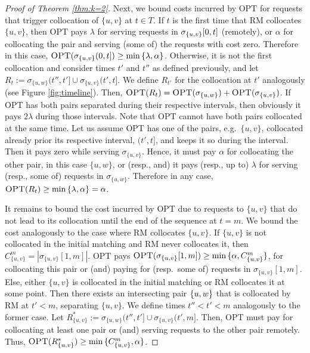 \documentclass[a4paper,anonymous,USenglish]{lipics-v2019}
\newcommand{\OPT}{\textsc{OPT}\xspace}
\newcommand{\RM}{\textsc{RM}\xspace} %
\DeclarePairedDelimiter\set{\{}{\}}
\begin{document}
\begin{proof}[Proof of Theorem \ref{thm:k=2}]
	
	Next,
	we bound  costs incurred by \OPT for requests that trigger collocation of $\{u,v\}$ at $t \in T$.
	If $t$ is the first time that \RM collocates $\{u,v\}$,
	 then  \OPT pays
	$\lambda$ for serving requests in $\sigma_{\set{u,v}}[0,t]$ (remotely),
	or $\alpha$ for collocating the pair and
	serving (some of) the requests with  cost zero.
	Therefore in this case,
	$\OPT(\sigma_{\{u,v\}}(0,t]) \geq  \min{\{ \lambda,\alpha \}}$.
	Otherwise,
	it is not the first collocation and
	consider times $t'$ and $t''$ as defined previously,
	 and let 
	$R_t := \sigma_{\{u,w\}}(t'',t'] \cup \sigma_{\{u,v\}}(t',t] $.
	We define $R_{t'}$ for the collocation at $t'$  analogously
	(see Figure \ref{fig:timeline}).
	Then,
	$\OPT(R_t) =\OPT (\sigma_{\{u,w\}}) 
	+ \OPT(\sigma_{\{u,v\}}) $.
	If \OPT has both pairs separated during their respective intervals,
	then obviously it pays $2\lambda$ during those intervals.
	Note that \OPT cannot have both pairs collocated at the same time.
	Let us assume \OPT has one of the pairs,
	e.g.~$\{u,v\}$,
	 collocated already prior its respective interval, $(t',t]$,
	 and keeps it so during the interval.
	 Then it pays zero while serving $\sigma_{\{u,v\}}$.
	Hence,
	it must pay $\alpha$ for collocating the other pair, in this case $\{u,w\}$,
	or (resp., and) it pays (resp., up to) $\lambda$ for serving (resp., some of) requests in $\sigma_{\{u,w\}}$. 
	Therefore in any case,
	$\OPT(R_t) \geq  \min{\{ \lambda,\alpha \}} = \alpha$.
	
	It remains to bound the cost  incurred by \OPT due to requests to $\{u,v\}$ that do not lead to its collocation until the end of the sequence at $t=m$.
	We bound the cost analogously to the case where \RM collocates $\{u,v\}$.
	If $\{u,v\}$ is not collocated in the initial matching
	and \RM never collocates it,
	then $ C^{m}_{ \{u,v\} } =| \sigma_{\{u,v\}}[1,m] |$.
	\OPT pays
	$\OPT(\sigma_{\{u,v\}}[1,m]) 
	\geq \min{ \{ \alpha, C^{m}_{ \{u,v\} } \} }$,
	for collocating this pair or (and) paying for (resp.~some of) requests in $\sigma_{\{u,v\}}[1,m]$.
	Else,
	either $\{u,v\}$ is collocated in the initial matching
	or \RM collocates it at some point.
	Then there exists an intersecting pair $\set{u,w}$
	that is collocated by \RM at $t' < m$,
	separating $\{u,v\}$.
	We define times $t'' < t' < m$ analogously to the former case.
	Let $R^*_{\{u,v\}} := \sigma_{\{u,w\}} (t'',t'] \cup \sigma_{\{u,v\}} (t',m]$.
	Then,
	\OPT must pay for collocating at least one pair or (and) serving requests 
	to the other pair remotely.
	Thus,
	$\OPT (R^*_{\{u,v\}}) 
	\geq  \min{ \{ C^{m}_{ \{u,v\}}, \alpha \}}$.
	

\end{proof}
\end{document}
